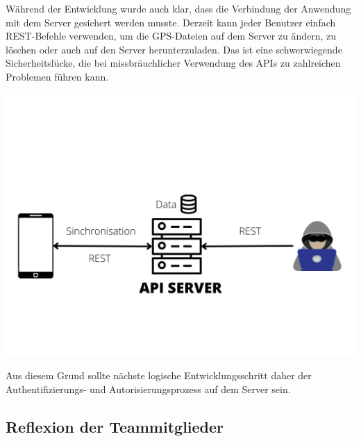 \documentclass[10pt]{article}
\begin{document}
    Während der Entwicklung wurde auch klar, dass die Verbindung der
    Anwendung mit dem Server gesichert werden musste. Derzeit kann jeder Benutzer einfach REST-Befehle verwenden, 
    um die GPS-Dateien auf dem Server zu ändern, zu löschen oder auch auf den Server
    herunterzuladen. Das ist eine schwerwiegende Sicherheitslücke, die bei missbräuchlicher Verwendung des APIs zu zahlreichen Problemen führen kann.
    \begin{center}
        \includegraphics[scale=0.4]{Rest_API.png}
    \end{center}
    Aus diesem Grund sollte nächste logische Entwicklungsschritt
    daher der Authentifizierungs- und Autorisierungsprozess auf dem Server sein.
\subsection{Reflexion der Teammitglieder}
\end{document}
